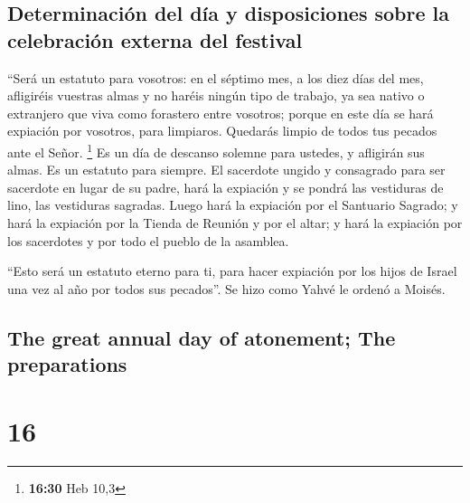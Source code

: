 \begin{paracol}{2}
\hypertarget{determinaciuxf3n-del-duxeda-y-disposiciones-sobre-la-celebraciuxf3n-externa-del-festival}{%
\subsection{Determinación del día y disposiciones sobre la celebración
externa del
festival}\label{determinaciuxf3n-del-duxeda-y-disposiciones-sobre-la-celebraciuxf3n-externa-del-festival}}

 ``Será un estatuto para vosotros: en el séptimo mes, a
los diez días del mes, afligiréis vuestras almas y no haréis ningún tipo
de trabajo, ya sea nativo o extranjero que viva como forastero entre
vosotros;  porque en este día se hará expiación por
vosotros, para limpiaros. Quedarás limpio de todos tus pecados ante el
Señor. \footnote{\textbf{16:30} Heb 10,3}  Es un día de
descanso solemne para ustedes, y afligirán sus almas. Es un estatuto
para siempre.  El sacerdote ungido y consagrado para ser
sacerdote en lugar de su padre, hará la expiación y se pondrá las
vestiduras de lino, las vestiduras sagradas.  Luego hará
la expiación por el Santuario Sagrado; y hará la expiación por la Tienda
de Reunión y por el altar; y hará la expiación por los sacerdotes y por
todo el pueblo de la asamblea.

 ``Esto será un estatuto eterno para ti, para hacer
expiación por los hijos de Israel una vez al año por todos sus
pecados''. Se hizo como Yahvé le ordenó a Moisés.

\switchcolumn
\begin{otherlanguage}{english}

\hypertarget{the-great-annual-day-of-atonement-the-preparations}{%
\subsection{The great annual day of atonement; The
preparations}\label{the-great-annual-day-of-atonement-the-preparations}}

\hypertarget{section-31}{%
\section{16}\label{section-31}}


\end{otherlanguage}
\end{paracol}
